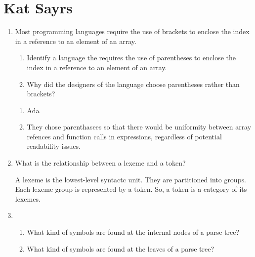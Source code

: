 
\chapter{Kat Sayrs}

\begin{enumerate}
  \item Most programming languages require the use of brackets to
    enclose the index in a reference to an element of an array.
  \begin{enumerate}
    \item Identify a language the requires the use of parentheses
      to enclose the index in a reference to an element of an array.
    \item Why did the designers of the language choose parentheses
      rather than brackets?
    \end{enumerate}

  \begin{answer}

  \begin{enumerate}
    \item Ada
    \item They chose parenthasees so that there would be uniformity between array refences and function calls in expressions, regardless of potential readability issues.
    \end{enumerate}

    \end{answer}
    
  \item What is the relationship between a lexeme and a token?

  \begin{answer}

    A lexeme is the lowest-level syntactc unit. They are partitioned into groups. 
Each lexeme group is represented by a token. So, a token is a category of its lexemes.

    \end{answer}

  \item
  \begin{enumerate}
    \item What kind of symbols are found at the internal nodes of a
      parse tree?
    \item What kind of symbols are found at the leaves of a parse tree?
    \end{enumerate}

  \begin{answer}


\end{answer}
\end{enumerate}
